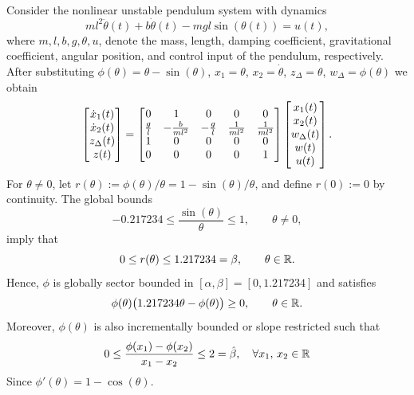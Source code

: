 \documentclass[journal,10pt,doublecolumn,twoside,a4paper]{IEEEtran}
\begin{document}
Consider the nonlinear unstable pendulum system with dynamics
\begin{equation}\label{eq:pendulum} 
    ml^2\ddot{\theta}(t) + b\dot{\theta}(t) - mgl\sin(\theta(t)) = u(t),
\end{equation}
where $m,l,b,g,\theta,u$, denote the mass, length, damping coefficient, gravitational coefficient, angular position, and control input
of the pendulum, respectively. After substituting $\phi(\theta) = \theta - \sin(\theta)$, $x_1 = \theta$, $x_2 = \dot{\theta}$, 
$z_\Delta = \theta$, $w_\Delta = \phi(\theta)$ we obtain
\begin{equation}\label{eq:loop-shifted-pendulum}
    \begin{bmatrix}\dot{x}_1(t) \\ \dot{x}_2(t) \\ z_\Delta(t) \\ z(t)\end{bmatrix}
    =
    \begin{bmatrix}0 & 1 & 0 & 0 & 0\\
    \frac{g}{l} & -\frac{b}{ml^2} & -\frac{g}{l} & \frac{1}{ml^2} & \frac{1}{ml^2}\\
    1 & 0 & 0 & 0 & 0\\
    0 & 0 & 0 & 0 & 1\end{bmatrix}
    \begin{bmatrix}x_1(t) \\ x_2(t) \\ w_\Delta(t) \\ w(t) \\ u(t)\end{bmatrix}.
\end{equation}
For $\theta\neq0$, let
$r(\theta):=\phi(\theta)/\theta=1-\sin(\theta)/\theta$, and define
$r(0):=0$ by continuity. The global bounds
\begin{equation*}
    -0.217234\leq\frac{\sin(\theta)}{\theta}\leq1,
    \qquad \theta\neq0,
\end{equation*}
imply that
\begin{equation*}
    0\leq r(\theta)\leq1.217234 = \beta,\qquad \theta\in\mathbb{R}.
\end{equation*}
Hence, $\phi$ is globally sector bounded in $[\alpha,\beta]=[0,1.217234]$ and
satisfies
\begin{equation*}
    \phi(\theta)\bigl(1.217234\theta-\phi(\theta)\bigr)\geq0,
    \qquad \theta\in\mathbb{R}.
\end{equation*}
Moreover, $\phi(\theta)$ is also incrementally bounded or slope restricted such that 
\begin{equation*}
    0 \leq \frac{\phi(x_1) - \phi(x_2)}{x_1 - x_2} \leq 2 = \hat{\beta}, \quad \forall x_1,\,x_2\in\mathbb{R}
\end{equation*}
Since $\phi'(\theta) = 1 - \cos(\theta)$.
\end{document}
